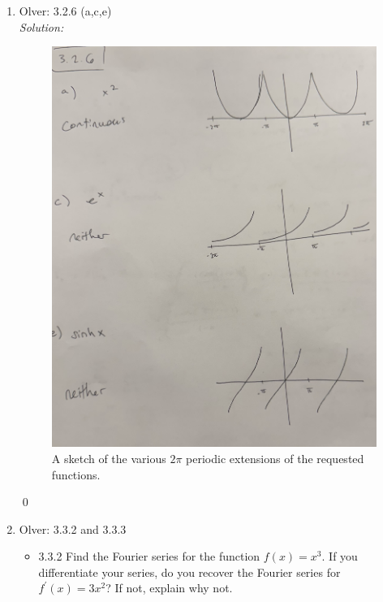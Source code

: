 \documentclass[10pt]{amsart}
\theoremstyle{nonumberplain}
\begin{document}
\begin{enumerate}[label={\bf {\arabic*}:}]
\item Olver: 3.2.6 (a,c,e) \\

\noindent
\textit{Solution:} \\
\begin{figure}[h]
	\centering
	\includegraphics[width=.55\textwidth]{pdes_hw_03.png}
 	\caption{A sketch of the various $2\pi$ periodic extensions of the requested functions. }\label{fig:f1}
\end{figure}
\qed \\

\newpage


\item Olver: 3.3.2 and 3.3.3 \\
\begin{itemize}
\item 3.3.2 Find the Fourier series for the function $f(x) = x^3$.
If you differentiate your series, do you recover the Fourier series for $f^\prime(x) = 3x^2$?
If not, explain why not. \\


\end{itemize}
\end{enumerate}
\end{document}
